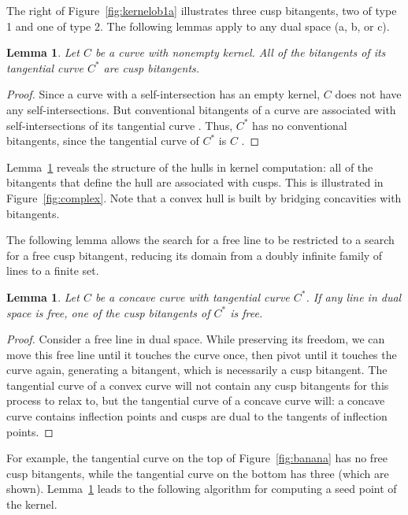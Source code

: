 \documentclass{sig-alternate}
\newtheorem{lemma}[theorem]{Lemma}
\begin{document}
\noindent The right of Figure~\ref{fig:kernelob1a} illustrates three cusp bitangents,
two of type 1 and one of type 2.
The following lemmas apply to any dual space (a, b, or c).

\begin{lemma}
\label{lem:allcusp}
Let $C$ be a curve with nonempty kernel.
All of the bitangents of its tangential curve $C^*$ are cusp bitangents.
\end{lemma}
\begin{proof}
Since a curve with a self-intersection has an empty kernel,
$C$ does not have any self-intersections.
But conventional bitangents of a curve are associated
with self-intersections of its tangential curve \cite{jj01}.
Thus, $C^*$ has no conventional bitangents, since the tangential curve of $C^*$ is $C$ \cite{jj02}.
\end{proof}

Lemma~\ref{lem:allcusp} reveals the structure of the hulls in kernel computation:
all of the bitangents that define the hull are associated with cusps.
This is illustrated in Figure~\ref{fig:complex}.
Note that a convex hull is built by bridging concavities with bitangents.

The following lemma allows the search for a free line to be restricted
to a search for a free cusp bitangent,
reducing its domain from a doubly infinite family of lines to a finite set.

\begin{lemma}
\label{lem:cuspisenough}
Let $C$ be a concave curve with tangential curve $C^*$.
If any line in dual space is free,
one of the cusp bitangents of $C^*$ is free.
\end{lemma}
\begin{proof}
Consider a free line in dual space.
While preserving its freedom, we can move this free line 
until it touches the curve once,
then pivot until it touches the curve again, generating a bitangent,
which is necessarily a cusp bitangent.
The tangential curve of a convex curve will not contain any cusp bitangents
for this process to relax to, but the tangential curve of a concave curve will:
a concave curve contains inflection points and
cusps are dual to the tangents of inflection points.
\end{proof}

For example, the tangential curve on the top of Figure~\ref{fig:banana}
has no free cusp bitangents, while the tangential curve on the bottom
has three (which are shown).
Lemma~\ref{lem:cuspisenough} leads to the following algorithm for computing a seed point of the kernel.
\end{document}
